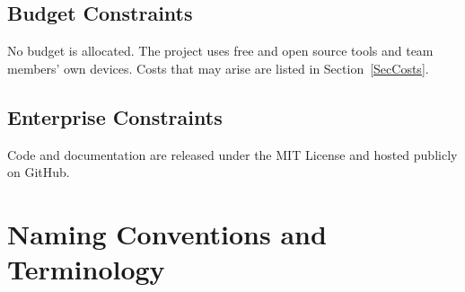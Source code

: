 \documentclass[12pt]{article}
\begin{document}
\subsection{Budget Constraints}
No budget is allocated. The project uses free and open source tools and team
members' own devices. Costs that may arise are listed in Section~\ref{SecCosts}.

\subsection{Enterprise Constraints} \label{SecEnterprise}
Code and documentation are released under the MIT License and hosted publicly
on GitHub.

\section{Naming Conventions and Terminology}
\end{document}
